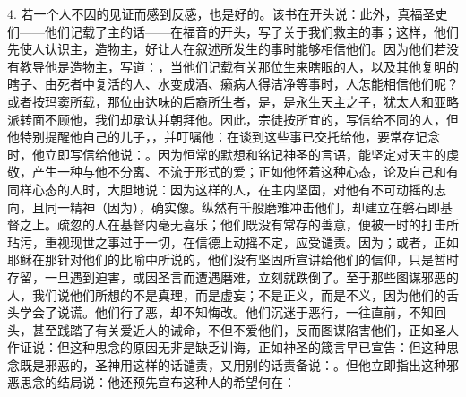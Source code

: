 4. 若一个人不因的见证而感到反感，也是好的。该书在开头说：此外，真福圣史们——他们记载了主的话——在福音的开头，写了关于我们救主的事；这样，他们先使人认识主，造物主，好让人在叙述所发生的事时能够相信他们。因为他们若没有教导他是造物主，写道：，当他们记载有关那位生来瞎眼的人，以及其他复明的瞎子、由死者中复活的人、水变成酒、癞病人得洁净等事时，人怎能相信他们呢？或者按玛窦所载，那位由达味的后裔所生者，是，是永生天主之子，犹太人和亚略派转面不顾他，我们却承认并朝拜他。因此，宗徒按所宜的，写信给不同的人，但他特别提醒他自己的儿子，，并叮嘱他：在谈到这些事已交托给他，要常存记念时，他立即写信给他说：。因为恒常的默想和铭记神圣的言语，能坚定对天主的虔敬，产生一种与他不分离、不流于形式的爱；正如他怀着这种心态，论及自己和有同样心态的人时，大胆地说：因为这样的人，在主内坚固，对他有不可动摇的志向，且同一精神（因为），确实像。纵然有千般磨难冲击他们，却建立在磐石即基督之上。疏忽的人在基督内毫无喜乐；他们既没有常存的善意，便被一时的打击所玷污，重视现世之事过于一切，在信德上动摇不定，应受谴责。因为；或者，正如耶稣在那针对他们的比喻中所说的，他们没有坚固所宣讲给他们的信仰，只是暂时存留，一旦遇到迫害，或因圣言而遭遇磨难，立刻就跌倒了。至于那些图谋邪恶的人，我们说他们所想的不是真理，而是虚妄；不是正义，而是不义，因为他们的舌头学会了说谎。他们行了恶，却不知悔改。他们沉迷于恶行，一往直前，不知回头，甚至践踏了有关爱近人的诫命，不但不爱他们，反而图谋陷害他们，正如圣人作证说：但这种思念的原因无非是缺乏训诲，正如神圣的箴言早已宣告：但这种思念既是邪恶的，圣神用这样的话谴责，又用别的话责备说：。但他立即指出这种邪恶思念的结局说：他还预先宣布这种人的希望何在：\par


